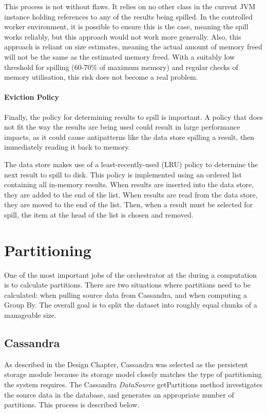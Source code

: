 This process is not without flaws. It relies on no other class in the current JVM instance  holding references to any of the results being spilled. In the controlled worker environment, it is possible to ensure this is the case, meaning the spill works reliably, but this approach would not work more generally. Also, this approach is reliant on size estimates, meaning the actual amount of memory freed will not be the same as the estimated memory freed. With a suitably low threshold for spilling (60-70\% of maximum memory) and regular checks of memory utilisation, this risk does not become a real problem.

\paragraph{Eviction Policy}
Finally, the policy for determining results to spill is important. A policy that does not fit the way the results are being used could result in large performance impacts, as it could cause antipatterns like the data store spilling a result, then immediately reading it back to memory.

The data store makes use of a least-recently-used (LRU) policy to determine the next result to spill to disk. This policy is implemented using an ordered list containing all in-memory results. When results are inserted into the data store, they are added to the end of the list. When results are read from the data store, they are moved to the end of the list. Then, when a result must be selected for spill, the item at the head of the list is chosen and removed.



\section{Partitioning}
One of the most important jobs of the orchestrator at the during a computation is to calculate partitions. There are two situations where partitions need to be calculated: when pulling source data from Cassandra, and when computing a Group By. The overall goal is to split the dataset into roughly equal chunks of a manageable size. 

\subsection{Cassandra}
As described in the Design Chapter, Cassandra was selected as the persistent storage module because its storage model closely matches the type of partitioning the system requires. The Cassandra \textit{DataSource} getPartitions method investigates the source data in the database, and generates an appropriate number of partitions. This process is described below.

